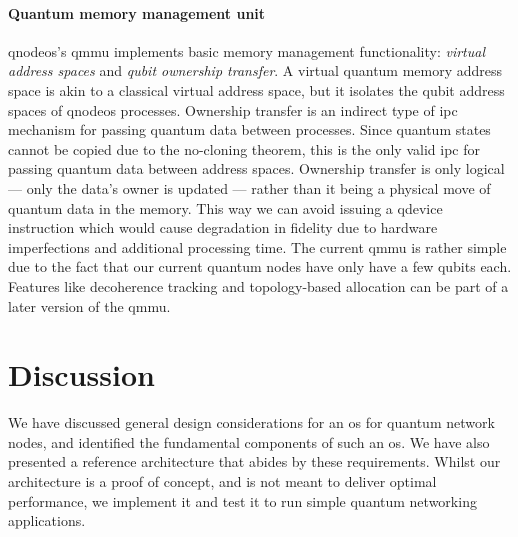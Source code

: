 \paragraph{Quantum memory management unit}

\acrshort{qnodeos}'s \acrshort{qmmu} implements basic memory management functionality: \emph{virtual
address spaces} and \emph{qubit ownership transfer}. A virtual quantum memory address space is akin
to a classical virtual address space, but it isolates the qubit address spaces of \acrshort{qnodeos}
processes. Ownership transfer is an indirect type of \acrfull{ipc} mechanism for passing quantum
data between processes. Since quantum states cannot be copied due to the no-cloning theorem, this is
the only valid \acrshort{ipc} for passing quantum data between address spaces. Ownership transfer is
only logical --- only the data's owner is updated --- rather than it being a physical move of
quantum data in the memory. This way we can avoid issuing a \acrshort{qdevice} instruction which
would cause degradation in fidelity due to hardware imperfections and additional processing time.
The current \acrshort{qmmu} is rather simple due to the fact that our current quantum nodes have
only have a few qubits each. Features like decoherence tracking and topology-based allocation can be
part of a later version of the \acrshort{qmmu}.

\section{Discussion}

We have discussed general design considerations for an \acrshort{os} for quantum network nodes, and
identified the fundamental components of such an \acrshort{os}. We have also presented a reference
architecture that abides by these requirements. Whilst our architecture is a proof of concept, and
is not meant to deliver optimal performance, we implement it and test it to run simple quantum
networking applications.

\begin{xstretch}
\printbibliography[heading=subbibintoc,title={References},notcategory=noprint]
\end{xstretch}
